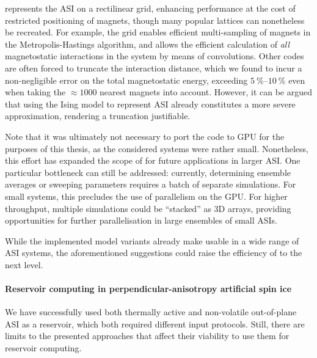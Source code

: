 \hotspice represents the ASI on a rectilinear grid, enhancing performance at the cost of restricted positioning of magnets, though many popular lattices can nonetheless be recreated.
For example, the grid enables efficient multi-sampling of magnets in the Metropolis-Hastings algorithm, and allows the efficient calculation of \textit{all} magnetostatic interactions in the system by means of convolutions.
Other codes are often forced to truncate the interaction distance, which we found to incur a non-negligible error on the total magnetostatic energy, exceeding $\SIrange{5}{10}{\percent}$ even when taking the $\approx 1000$ nearest magnets into account.
However, it can be argued that using the Ising model to represent ASI already constitutes a more severe approximation, rendering a truncation justifiable. \\\par

Note that it was ultimately not necessary to port the code to GPU for the purposes of this thesis, as the considered systems were rather small. %
Nonetheless, this effort has expanded the scope of \hotspice for future applications in larger ASI.
One particular bottleneck can still be addressed: currently, determining ensemble averages or sweeping parameters requires a batch of separate simulations.
For small systems, this precludes the use of parallelism on the GPU.
For higher throughput, multiple simulations could be ``stacked'' as 3D arrays, providing opportunities for further parallelisation in large ensembles of small ASIs. \\\par %

While the implemented model variants already make \hotspice usable in a wide range of ASI systems, the aforementioned suggestions could raise the efficiency of \hotspice to the next level.

\paragraph{Reservoir computing in perpendicular-anisotropy artificial spin ice}
We have successfully used both thermally active and non-volatile out-of-plane ASI as a reservoir, which both required different input protocols.
Still, there are limits to the presented approaches that affect their viability to use them for reservoir computing. \par

